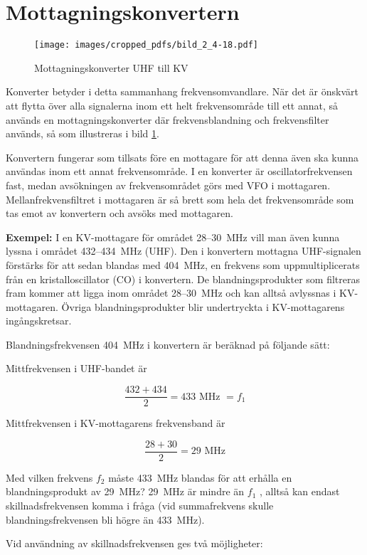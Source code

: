 \section{Mottagningskonvertern}

\begin{figure}
  \texttt{[image: images/cropped\_pdfs/bild\_2\_4-18.pdf]}
  \caption{Mottagningskonverter UHF till KV}
  \label{fig:bildII4-18}
\end{figure}

Konverter betyder i detta sammanhang frekvensomvandlare.
När det är önskvärt att flytta över alla signalerna inom ett helt frekvensområde
till ett annat, så används en mottagningskonverter där frekvensblandning och
frekvensfilter används, så som illustreras i bild \ref{fig:bildII4-18}.

Konvertern fungerar som tillsats före en mottagare för att denna även
ska kunna användas inom ett annat frekvensområde.
I en konverter är oscillatorfrekvensen fast, medan avsökningen av
frekvensområdet görs med VFO i mottagaren.
Mellanfrekvensfiltret i mottagaren är så brett som hela det frekvensområde
som tas emot av konvertern och avsöks med mottagaren.

\textbf{Exempel:}
I en KV-mottagare för området 28--30~MHz vill man även kunna lyssna i området
432--434~MHz (UHF).
Den i konvertern mottagna UHF-signalen förstärks för att sedan blandas med
404~MHz, en frekvens som uppmultiplicerats från en kristalloscillator (CO) i
konvertern.
De blandningsprodukter som filtreras fram kommer att ligga inom området
28--30~MHz och kan alltså avlyssnas i KV-mottagaren.
Övriga blandningsprodukter blir undertryckta i KV-mottagarens ingångskretsar.

Blandningsfrekvensen 404~MHz i konvertern är beräknad på följande sätt:

Mittfrekvensen i UHF-bandet är

\[\frac{432+434}{2} = 433\text{ MHz } = f_1\]

Mittfrekvensen i KV-mottagarens frekvensband är

\[\frac{28 + 30}{2} = 29\text{ MHz}\]

Med vilken frekvens \(f_2\) måste 433~MHz blandas för att erhålla en
blandningsprodukt av 29~MHz?
29~MHz är mindre än \(f_1\) , alltså kan endast skillnadsfrekvensen komma i
fråga (vid summafrekvens skulle blandningsfrekvensen bli högre än 433~MHz).

Vid användning av skillnadsfrekvensen ges två möjligheter:

